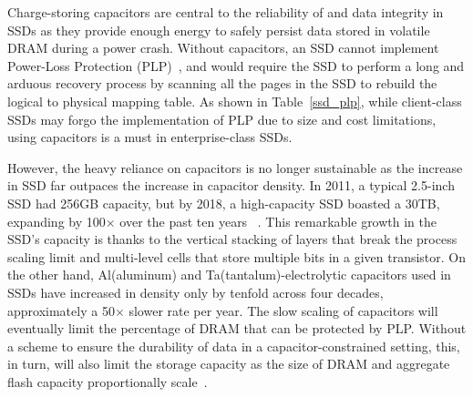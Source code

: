 Charge-storing capacitors are central to the reliability of and data integrity in SSDs 
as they provide enough energy to safely persist data stored in volatile DRAM during a power crash. 
Without capacitors, an SSD cannot implement Power-Loss Protection (PLP)~\cite{micron2014, intel2014, samsungplp2016}, 
and would require the SSD to perform a long and arduous recovery process by scanning all the pages in the SSD to rebuild the logical to physical mapping table. 
As shown in Table~\ref{ssd_plp}, 
while client-class SSDs may forgo the implementation of PLP due to size and cost limitations, 
using capacitors is a must in enterprise-class SSDs. 



However, the heavy reliance on capacitors is no longer sustainable as the increase in SSD far outpaces 
the increase in capacitor density.
In 2011, a typical 2.5-inch SSD had 256GB capacity, but
by 2018, a high-capacity SSD boasted a 30TB, expanding by 100$\times$ over the past ten years
~\cite{samsung2011, anandtech18samsung}. 
This remarkable growth in the SSD's capacity is thanks to the vertical stacking of layers that break the process scaling limit and multi-level cells that store multiple bits in a given transistor.
On the other hand, Al(aluminum) and Ta(tantalum)-electrolytic capacitors used in SSDs 
have increased in density only by tenfold across four decades,
approximately a 50$\times$ slower rate per year. 
The slow scaling of capacitors will eventually limit the percentage of DRAM that can be protected by PLP.
Without a scheme to ensure the durability of data in a capacitor-constrained setting, 
this, in turn, will also limit the storage capacity as the size of DRAM and aggregate flash capacity proportionally scale~\cite{ni2017hash}. 

